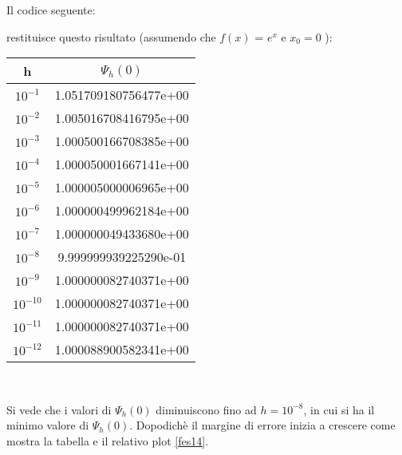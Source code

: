Il codice seguente:

restituisce questo risultato (assumendo che $f(x)$ = $ e^x $ e $ x_0 = 0 $ ): 
\begin{center}
\begin{tabular}{c|c}
h & \( \Psi_{h}(0) \)  \\
\hline
    \(10^{-1}\) & 1.051709180756477e+00\\
    \(10^{-2}\) & 1.005016708416795e+00\\
    \(10^{-3}\) & 1.000500166708385e+00\\
    \(10^{-4}\) & 1.000050001667141e+00\\
    \(10^{-5}\) & 1.000005000006965e+00\\
    \(10^{-6}\) & 1.000000499962184e+00\\
    \(10^{-7}\) & 1.000000049433680e+00\\
    \(10^{-8}\) & 9.999999939225290e-01\\
    \(10^{-9}\) & 1.000000082740371e+00\\
    \(10^{-10}\) & 1.000000082740371e+00\\
    \(10^{-11}\) & 1.000000082740371e+00\\
    \(10^{-12}\) & 1.000088900582341e+00\\
\end{tabular} \\
\end{center}
Si vede che i valori di $\Psi_{h}(0)$ diminuiscono fino ad $h = 10^{-8}$, in cui si ha il minimo valore di $\Psi_{h}(0)$. Dopodichè il margine di errore inizia a crescere come mostra la tabella e il relativo plot \ref{fes14}.